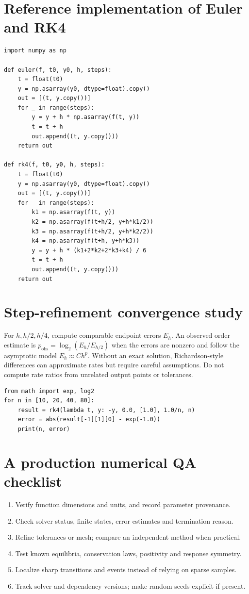 \documentclass[11pt,letterpaper,oneside]{report}
\theoremstyle{definition}\newtheorem{definition}[theorem]{Definition}
\theoremstyle{remark}\newtheorem{remark}[theorem]{Remark}
\begin{document}
\section{Reference implementation of Euler and RK4}
\begin{lstlisting}
import numpy as np

def euler(f, t0, y0, h, steps):
    t = float(t0)
    y = np.asarray(y0, dtype=float).copy()
    out = [(t, y.copy())]
    for _ in range(steps):
        y = y + h * np.asarray(f(t, y))
        t = t + h
        out.append((t, y.copy()))
    return out

def rk4(f, t0, y0, h, steps):
    t = float(t0)
    y = np.asarray(y0, dtype=float).copy()
    out = [(t, y.copy())]
    for _ in range(steps):
        k1 = np.asarray(f(t, y))
        k2 = np.asarray(f(t+h/2, y+h*k1/2))
        k3 = np.asarray(f(t+h/2, y+h*k2/2))
        k4 = np.asarray(f(t+h, y+h*k3))
        y = y + h * (k1+2*k2+2*k3+k4) / 6
        t = t + h
        out.append((t, y.copy()))
    return out
\end{lstlisting}
\section{Step-refinement convergence study}
For $h,h/2,h/4$, compute comparable endpoint errors $E_h$. An observed order estimate is $p_{\mathrm{obs}}=\log_2(E_h/E_{h/2})$ when the errors are nonzero and follow the asymptotic model $E_h\approx C h^p$. Without an exact solution, Richardson-style differences can approximate rates but require careful assumptions. Do not compute rate ratios from unrelated output points or tolerances.
\begin{lstlisting}
from math import exp, log2
for n in [10, 20, 40, 80]:
    result = rk4(lambda t, y: -y, 0.0, [1.0], 1.0/n, n)
    error = abs(result[-1][1][0] - exp(-1.0))
    print(n, error)
\end{lstlisting}
\section{A production numerical QA checklist}
\begin{enumerate}
\item Verify function dimensions and units, and record parameter provenance.
\item Check solver status, finite states, error estimates and termination reason.
\item Refine tolerances or mesh; compare an independent method when practical.
\item Test known equilibria, conservation laws, positivity and response symmetry.
\item Localize sharp transitions and events instead of relying on sparse samples.
\item Track solver and dependency versions; make random seeds explicit if present.
\end{enumerate}
\end{document}
